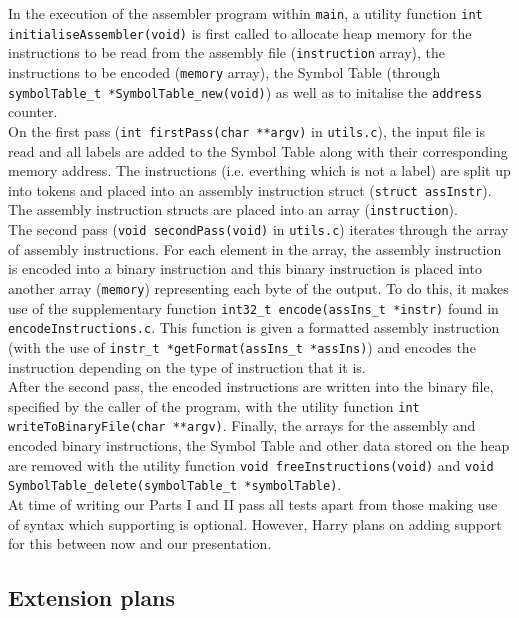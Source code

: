 \documentclass[11pt]{article}
\begin{document}
In the execution of the assembler program within \texttt{main}, a utility function \texttt{int initialiseAssembler(void)} is first called to allocate heap memory for the instructions to be read from the assembly file (\texttt{instruction} array), the instructions to be encoded (\texttt{memory} array), the Symbol Table (through \texttt{symbolTable\_t *SymbolTable\_new(void)}) as well as to initalise the \texttt{address} counter.\\

On the first pass (\texttt{int firstPass(char **argv)} in \texttt{utils.c}), the input file is read and all labels are added to the Symbol Table along with their corresponding memory address. The instructions (i.e. everthing which is not a label) are split up into tokens and placed into an assembly instruction struct (\texttt{struct assInstr}). The assembly instruction structs are placed into an array (\texttt{instruction}).\\

The second pass (\texttt{void secondPass(void)} in \texttt{utils.c}) iterates through the array of assembly instructions. For each element in the array, the assembly instruction is encoded into a binary instruction and this binary instruction is placed into another array (\texttt{memory}) representing each byte of the output. To do this, it makes use of the supplementary function \texttt{int32\_t encode(assIns\_t *instr)} found in \texttt{encodeInstructions.c}. This function is given a formatted assembly instruction (with the use of \texttt{instr\_t *getFormat(assIns\_t *assIns)}) and encodes the instruction depending on the type of instruction that it is.\\

After the second pass, the encoded instructions are written into the binary file, specified by the caller of the program, with the utility function \texttt{int writeToBinaryFile(char **argv)}. Finally, the arrays for the assembly and encoded binary instructions, the Symbol Table  and other data stored on the heap are removed with the utility function \texttt{void freeInstructions(void)} and \texttt{void SymbolTable\_delete(symbolTable\_t *symbolTable)}.\\

At time of writing our Parts I and II pass all tests apart from those making use of syntax which supporting is optional. However, Harry plans on adding support for this between now and our presentation.

\subsection{Extension plans}
\end{document}

